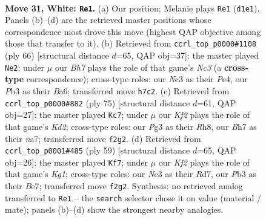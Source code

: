 \documentclass[11pt]{article}
\begin{document}
\clearpage

\begin{figure}[p]\centering
\begin{subfigure}{0.46\textwidth}\centering
\resizebox{\linewidth}{!}{%
\newchessgame
\chessboard[
  setfen={7r/3bk2B/1p2p3/p3n3/P5r1/1PN3P1/5K2/R2R4 w - - 2 31},
  showmover=false,
  pgfstyle=straightmove, color=movearrow, markmove={d1-e1}
]}
\caption{}
\end{subfigure}\hfill
\begin{subfigure}{0.46\textwidth}\centering
\resizebox{\linewidth}{!}{%
\newchessgame
\chessboard[
  setfen={6k1/5p2/B3bnpp/4R3/4P3/2N2P1P/2r3P1/6K1 w - - 1 34},
  showmover=false,
  pgfstyle=straightmove, color=movearrow, markmove={c3-e2}
]}
\caption{}
\end{subfigure}
\\[4pt]
\begin{subfigure}{0.46\textwidth}\centering
\resizebox{\linewidth}{!}{%
\newchessgame
\chessboard[
  setfen={r6r/Np1k4/4p3/2Ppnp2/7R/P4PP1/6K1/1R6 b - - 2 38},
  showmover=false,
  pgfstyle=straightmove, color=movearrow, markmove={d7-c7}
]}
\caption{}
\end{subfigure}\hfill
\begin{subfigure}{0.46\textwidth}\centering
\resizebox{\linewidth}{!}{%
\newchessgame
\chessboard[
  setfen={6k1/p1rrb1pp/Rp6/5n2/4NP2/1PB2P2/1P4KP/R7 b - - 8 30},
  showmover=false,
  pgfstyle=straightmove, color=movearrow, markmove={g8-f7}
]}
\caption{}
\end{subfigure}
\caption{\textbf{Move 31, White: \texttt{Re1}.} (a) Our position; Melanie plays \texttt{Re1} (\texttt{d1e1}). Panels (b)--(d) are the retrieved master positions whose correspondence most drove this move (highest QAP objective among those that transfer to it). (b) Retrieved from \texttt{ccrl\_top\_p0000\#1108} (ply 66) [structural distance $d$=65, QAP obj=37]: the master played \texttt{Ne2}; under $\mu$ our \emph{Bh7} plays the role of that game's \emph{Nc3} (a \textbf{cross-type} correspondence); cross-type roles: our \emph{N}c3 as their \emph{P}e4, our \emph{P}b3 as their \emph{B}a6; transferred move \texttt{h7c2}. (c) Retrieved from \texttt{ccrl\_top\_p0000\#882} (ply 75) [structural distance $d$=61, QAP obj=27]: the master played \texttt{Kc7}; under $\mu$ our \emph{Kf2} plays the role of that game's \emph{Kd2}; cross-type roles: our \emph{P}g3 as their \emph{R}h8, our \emph{B}h7 as their \emph{n}a7; transferred move \texttt{f2g2}. (d) Retrieved from \texttt{ccrl\_top\_p0001\#485} (ply 59) [structural distance $d$=65, QAP obj=26]: the master played \texttt{Kf7}; under $\mu$ our \emph{Kf2} plays the role of that game's \emph{Kg1}; cross-type roles: our \emph{N}c3 as their \emph{R}d7, our \emph{P}b3 as their \emph{B}e7; transferred move \texttt{f2g2}. Synthesis: no retrieved analog transferred to \texttt{Re1} -- the \texttt{search} selector chose it on value (material / mate); panels (b)--(d) show the strongest nearby analogies.}
\label{fig:thought-m60}
\end{figure}
\end{document}
